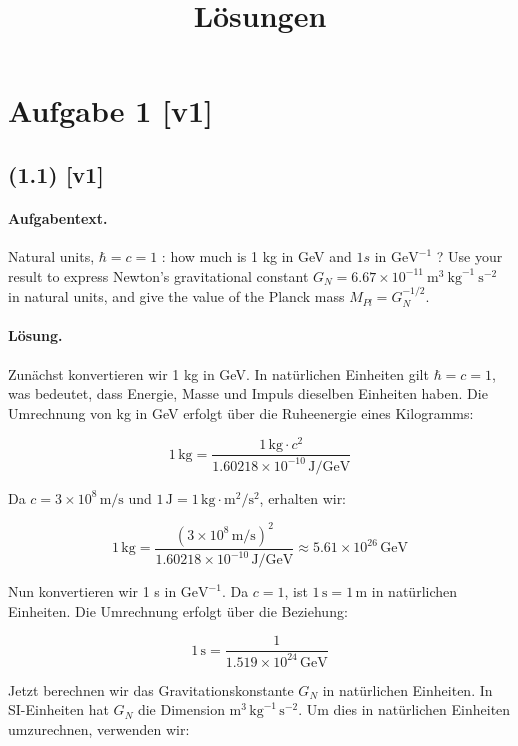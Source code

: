 \documentclass[11pt,a4paper]{article}
\title{Lösungen}
\date{}
\begin{document}
\maketitle

\section*{Aufgabe 1 [v1]}
\subsection*{(1.1) [v1]}
\paragraph{Aufgabentext.}
Natural units, $\hbar=c=1$ : how much is 1 kg in GeV and $1 s$ in $\mathrm{GeV}^{-1}$ ? Use your result to express Newton's gravitational constant $G_N=6.67 \times 10^{-11} \mathrm{~m}^3 \mathrm{~kg}^{-1} \mathrm{~s}^{-2}$ in natural units, and give the value of the Planck mass $M_{P l}=G_N^{-1 / 2}$.

\paragraph{Lösung.}
Zunächst konvertieren wir 1 kg in GeV. In natürlichen Einheiten gilt $\hbar = c = 1$, was bedeutet, dass Energie, Masse und Impuls dieselben Einheiten haben. Die Umrechnung von kg in GeV erfolgt über die Ruheenergie eines Kilogramms:

\[
1 \, \text{kg} = \frac{1 \, \text{kg} \cdot c^2}{1.60218 \times 10^{-10} \, \text{J/GeV}}
\]

Da $c = 3 \times 10^8 \, \text{m/s}$ und $1 \, \text{J} = 1 \, \text{kg} \cdot \text{m}^2/\text{s}^2$, erhalten wir:

\[
1 \, \text{kg} = \frac{(3 \times 10^8 \, \text{m/s})^2}{1.60218 \times 10^{-10} \, \text{J/GeV}} \approx 5.61 \times 10^{26} \, \text{GeV}
\]

Nun konvertieren wir 1 s in $\mathrm{GeV}^{-1}$. Da $c = 1$, ist $1 \, \text{s} = 1 \, \text{m}$ in natürlichen Einheiten. Die Umrechnung erfolgt über die Beziehung:

\[
1 \, \text{s} = \frac{1}{1.519 \times 10^{24} \, \text{GeV}}
\]

Jetzt berechnen wir das Gravitationskonstante $G_N$ in natürlichen Einheiten. In SI-Einheiten hat $G_N$ die Dimension $\mathrm{m}^3 \, \mathrm{kg}^{-1} \, \mathrm{s}^{-2}$. Um dies in natürlichen Einheiten umzurechnen, verwenden wir:
\end{document}
